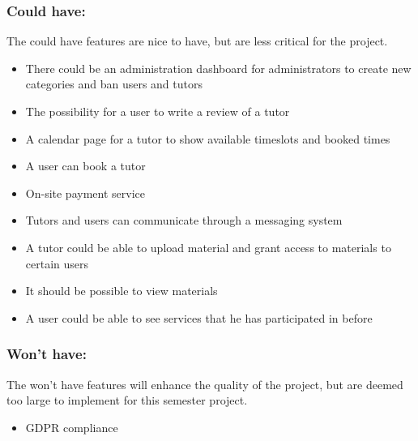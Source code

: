 \subsubsection{Could have:}
The could have features are nice to have, but are less critical for the project.

\begin{itemize}
    \item There could be an administration dashboard for administrators to create new categories and ban users and tutors
    \item The possibility for a user to write a review of a tutor
    \item A calendar page for a tutor to show available timeslots and booked times
    \item A user can book a tutor
    \item On-site payment service
    \item Tutors and users can communicate through a messaging system
    \item A tutor could be able to upload material and grant access to materials to certain users
    \item It should be possible to view materials
    \item A user could be able to see services that he has participated in before
\end{itemize}

\subsubsection{Won't have:}
The won't have features will enhance the quality of the project, but are deemed too large to implement for this semester project.
\begin{itemize}
    \item GDPR compliance
\end{itemize}
